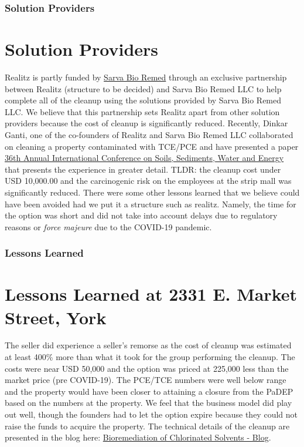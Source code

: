 \documentclass{beamer}
\begin{document}
\begin{frame}
\frametitle{Solution Providers}

\section{Solution Providers}

Realitz is partly funded by \href{https://www.sarvabioremed.com}{Sarva Bio Remed} through an exclusive partnership between Realitz (structure to be decided) and Sarva Bio Remed LLC to help complete all of the cleanup using the solutions provided by Sarva Bio Remed LLC. We believe that this partnership sets Realitz apart from other solution providers because the cost of cleanup is significantly reduced. Recently, Dinkar Ganti, one of the co-founders of Realitz and Sarva Bio Remed LLC collaborated on cleaning a property contaminated with TCE/PCE and have presented a paper \href{https://dservgun.github.io/posts/aehsposterpresentation/}{36th Annual International Conference on Soils, Sediments, Water and Energy} that presents the experience in greater detail. TLDR: the cleanup cost under USD 10,000.00 and the carcinogenic risk on the employees at the strip mall was significantly reduced. There were some other lessons learned that we believe could have been avoided had we put it a structure such as realitz. Namely, the time for the option was short and did not take into account delays due to regulatory reasons or \textit{force majeure} due to the COVID-19 pandemic. 

\end{frame}

\begin{frame}
\frametitle{Lessons Learned }

\section{Lessons Learned at 2331 E. Market Street, York}

The seller did experience a seller's remorse as the cost of cleanup was estimated at least 400\% more than what it took for the group performing the cleanup. The costs were near USD 50,000 and the option was priced at 225,000 less than the market price (pre COVID-19). The PCE/TCE numbers were well below range and the property would have been closer to attaining a closure from the PaDEP based on the numbers at the property. We feel that the business model did play out well, though the founders had to let the option expire because they could not raise the funds to acquire the property.
The technical details of the cleanup are presented in the blog here: \href{https://dservgun.github.io/}{Bioremediation of Chlorinated Solvents - Blog}. 
\end{frame}
\end{document}
